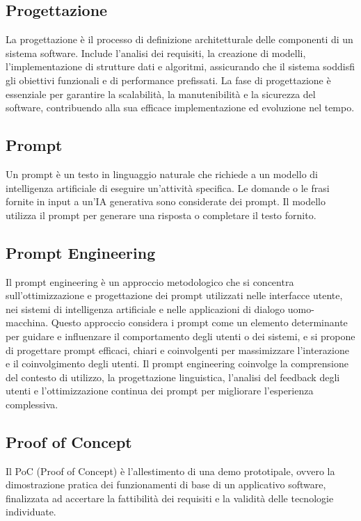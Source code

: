 \vspace{2em}
\subsection*{Progettazione}
\par La progettazione è il processo di definizione architetturale delle componenti di un sistema software. Include l'analisi dei requisiti, la creazione di modelli, l'implementazione di strutture dati e algoritmi, assicurando che il sistema soddisfi gli obiettivi funzionali e di performance prefissati. La fase di progettazione è essenziale per garantire la scalabilità, la manutenibilità e la sicurezza del software, contribuendo alla sua efficace implementazione ed evoluzione nel tempo.

\vspace{2em}
\subsection*{Prompt}
\par Un prompt è un testo in linguaggio naturale che richiede a un modello di intelligenza artificiale di eseguire un'attività specifica. Le domande o le frasi fornite in input a un'IA generativa sono considerate dei prompt. Il modello utilizza il prompt per generare una risposta o completare il testo fornito.

\vspace{2em}
\subsection*{Prompt Engineering}
\par Il prompt engineering è un approccio metodologico che si concentra sull'ottimizzazione e progettazione dei prompt utilizzati nelle interfacce utente, nei sistemi di intelligenza artificiale e nelle applicazioni di dialogo uomo-macchina. Questo approccio considera i prompt come un elemento determinante per guidare e influenzare il comportamento degli utenti o dei sistemi, e si propone di progettare prompt efficaci, chiari e coinvolgenti per massimizzare l'interazione e il coinvolgimento degli utenti. Il prompt engineering coinvolge la comprensione del contesto di utilizzo, la progettazione linguistica, l'analisi del feedback degli utenti e l'ottimizzazione continua dei prompt per migliorare l'esperienza complessiva.

\vspace{2em}
\subsection*{Proof of Concept}
\par Il PoC (Proof of Concept) è l’allestimento di una demo prototipale, ovvero la dimostrazione pratica dei funzionamenti di base di un applicativo software, finalizzata ad accertare la fattibilità dei requisiti e la validità delle tecnologie individuate.

